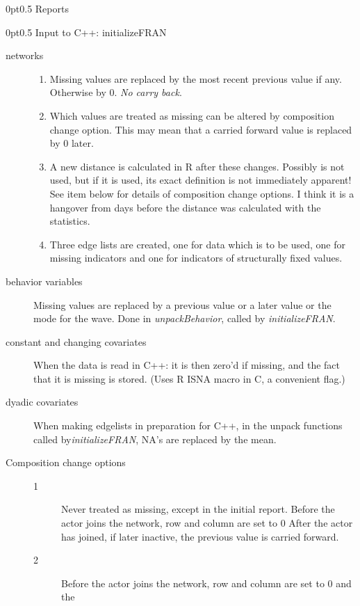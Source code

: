 \documentclass[12pt,a4paper]{article}
\makeatletter
\renewcommand{\=}{\,=\,}
\newcommand{\+}{\,+\,}
\newcommand{\nnm}[1]{\textsf{\small\textit{#1}}}
\renewcommand{\section}{\@startsection{section}{1}
                {0pt}{\baselineskip}{0.5\baselineskip}
                {\centering\sffamily} }
\makeatother
\begin{document}
\section{Reports}

\section{Input to C++: initializeFRAN}
\begin{description}
\item[networks]\hfill
\begin{enumerate}
\item Missing values are replaced by the most recent previous value if
  any. Otherwise by 0. \emph{No carry back}.
\item Which values are treated as missing can be altered by composition change
  option. This may mean that a carried forward value is replaced
  by 0 later.
\item A new distance is calculated in R after these changes. Possibly is not
  used, but if it is used, its exact definition is not immediately apparent! See
  item below for details of composition change options. I think it is a hangover
  from days before the distance was calculated with the statistics.
\item Three edge lists are created, one for data which is to be used, one for
  missing indicators and one for indicators of structurally fixed values.
\end{enumerate}
\item[behavior variables] Missing values are replaced by a previous value or a
  later value or the mode for the wave. Done in \nnm{unpackBehavior}, called by
  \nnm{initializeFRAN}.
\item[constant and changing covariates] When the data is read in C++: it is then
  zero'd if missing, and the fact that it is missing is stored.
 (Uses R ISNA macro in C, a convenient flag.)
\item[dyadic covariates] When making edgelists in preparation for C++, in the
  unpack functions called by\nnm{initializeFRAN}, NA's are replaced by the mean.
\item[Composition change options]\hfill
\begin{description}
\item[1] Never treated as missing, except in the initial report.
Before the actor joins the network, row and column are set to 0
After the actor has joined, if later inactive, the previous
value is carried forward.
\item[2] Before the actor joins the network, row and column are set to 0 and the

\end{description}
\end{description}
\end{document}
